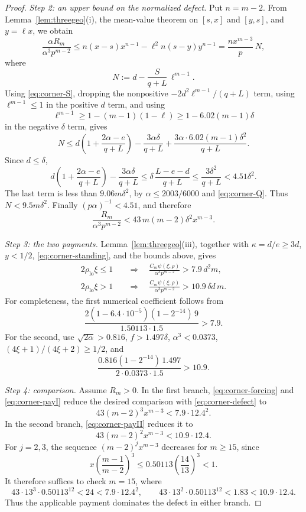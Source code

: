 \documentclass[11pt]{article}
\begin{document}
\begin{proof}
\emph{Step 2: an upper bound on the normalized defect.}
Put $n=m-2$.  From Lemma~\ref{lem:threegeo}(i), the mean-value theorem on
$[s,x]$ and $[y,s]$, and $y=\ell x$, we obtain
\[
 \frac{\alpha R_m}{\alpha^3p^{m-2}}
 \le n(x-s)x^{n-1}-\ell^2n(s-y)y^{n-1}
 =\frac{n x^{m-3}}p\,N,
\]
where
\[
 N:=d-\frac{S}{q+L}\,\ell^{m-1}.
\]
Using \eqref{eq:corner-S}, dropping the nonpositive
$-2d^2\ell^{m-1}/(q+L)$ term, using
$\ell^{m-1}\le1$ in the positive $d$ term, and using
\[
 \ell^{m-1}\ge1-(m-1)(1-\ell)
             \ge1-6.02(m-1)\delta
\]
in the negative $\delta$ term, gives
\[
 N\le
 d\left(1+\frac{2\alpha-e}{q+L}\right)
 -\frac{3\alpha\delta}{q+L}
 +\frac{3\alpha\cdot6.02(m-1)\delta^2}{q+L}.
\]
Since $d\le\delta$,
\[
 d\left(1+\frac{2\alpha-e}{q+L}\right)
 -\frac{3\alpha\delta}{q+L}
 \le\delta\,\frac{L-e-d}{q+L}
 \le\frac{3\delta^2}{q+L}<4.51\delta^2.
\]
The last term is less than $9.06m\delta^2$, by
$\alpha\le2003/6000$ and \eqref{eq:corner-Q}.  Thus
$N<9.5m\delta^2$.  Finally
$(p\alpha)^{-1}<4.51$, and therefore
\begin{equation}\label{eq:corner-defect}
 \frac{R_m}{\alpha^3p^{m-2}}
 <43\,m(m-2)\delta^2x^{m-3}.
\end{equation}

\emph{Step 3: the two payments.}
Lemma~\ref{lem:threegeo}(iii), together with
$\kappa=d/e\ge3d$, $y<1/2$, \eqref{eq:corner-standing}, and the bounds above,
gives
\begin{align}
 2\rho_{\mathrm{lo}}\xi\le1
 &\quad\Longrightarrow\quad
 \frac{C_m\psi(\xi,\rho)}{\alpha^3p^{m-2}}
 >7.9\,d^2m,                                      \label{eq:corner-payI}\\
 2\rho_{\mathrm{lo}}\xi>1
 &\quad\Longrightarrow\quad
 \frac{C_m\psi(\xi,\rho)}{\alpha^3p^{m-2}}
 >10.9\,\delta d\,m.                              \label{eq:corner-payII}
\end{align}
For completeness, the first numerical coefficient follows from
\[
 \frac{2(1-6.4\cdot10^{-5})(1-2^{-14})\,9}
      {1.50113\cdot1.5}>7.9.
\]
For the second, use
$\sqrt{2\alpha}>0.816$, $f>1.497\delta$,
$\alpha^3<0.0373$, $(4\xi+1)/(4\xi+2)\ge1/2$, and
\[
 \frac{0.816(1-2^{-14})\,1.497}{2\cdot0.0373\cdot1.5}>10.9.
\]

\emph{Step 4: comparison.}
Assume $R_m>0$.  In the first branch, \eqref{eq:corner-forcing} and
\eqref{eq:corner-payI} reduce the desired comparison with
\eqref{eq:corner-defect} to
\[
 43(m-2)^3x^{m-3}<7.9\cdot12.4^2.
\]
In the second branch, \eqref{eq:corner-payII} reduces it to
\[
 43(m-2)^2x^{m-3}<10.9\cdot12.4.
\]
For $j=2,3$, the sequence $(m-2)^j x^{m-3}$ decreases for $m\ge15$, since
\[
 x\left(\frac{m-1}{m-2}\right)^3
 \le0.50113\left(\frac{14}{13}\right)^3<1.
\]
It therefore suffices to check $m=15$, where
\[
 43\cdot13^3\cdot0.50113^{12}<24
 <7.9\cdot12.4^2,
 \qquad
 43\cdot13^2\cdot0.50113^{12}<1.83
 <10.9\cdot12.4.
\]
Thus the applicable payment dominates the defect in either branch.
\end{proof}
\end{document}

